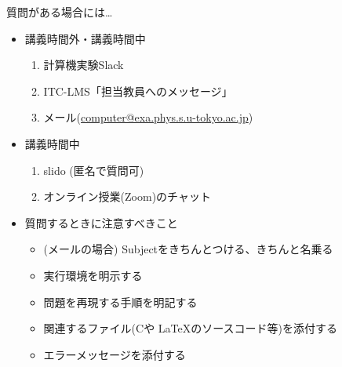 \begin{frame}[t]{質問がある場合には…}
  \begin{itemize}
  \item 講義時間外・講義時間中
    \begin{enumerate}
    \item 計算機実験Slack
    \item ITC-LMS「担当教員へのメッセージ」
    \item メール(\href{mailto:computer@exa.phys.s.u-tokyo.ac.jp}{computer@exa.phys.s.u-tokyo.ac.jp})
    \end{enumerate}
  \item 講義時間中
    \begin{enumerate}
    \item slido (匿名で質問可)
    \item オンライン授業(Zoom)のチャット
    \end{enumerate}
  \item 質問するときに注意すべきこと
    \begin{itemize}
    \item (メールの場合) Subjectをきちんとつける、きちんと名乗る
    \item 実行環境を明示する
    \item 問題を再現する手順を明記する
    \item 関連するファイル(Cや \LaTeX のソースコード等)を添付する
    \item エラーメッセージを添付する
    \end{itemize}
  \end{itemize}
\end{frame}

